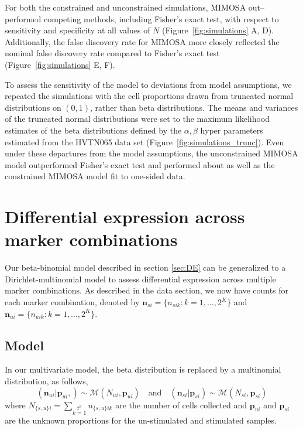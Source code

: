 \documentclass[11pt]{article}
\begin{document}
For both the constrained and unconstrained simulations, MIMOSA out--performed competing methods, including Fisher's exact test, with respect to sensitivity and specificity at all values of $N$ (Figure~\ref{fig:simulations} A, D). Additionally, the false discovery rate for MIMOSA more closely reflected the nominal false discovery rate compared to Fisher's exact test (Figure~\ref{fig:simulations} E, F).

To assess the sensitivity of the model to deviations from model assumptions, we repeated the simulations with the cell proportions drawn from  truncated normal distributions on $(0,1)$, rather than beta distributions. The means and variances of the truncated normal distributions were set to the maximum likelihood estimates of the beta distributions defined by the $\alpha,\beta$ hyper parameters estimated from the HVTN065 data set (Figure~\ref{fig:simulations_trunc}). Even under these departures from the model assumptions, the unconstrained MIMOSA model outperformed Fisher's exact test and performed about as well as the constrained MIMOSA model fit to one-sided data.

\section{Differential expression across marker combinations}
Our beta-binomial model described in section \ref{sec:DE} can be generalized to a Dirichlet-multinomial model to assess differential expression across multiple marker combinations. As described in the data section, we now have counts for each marker combination, denoted by  $\mathbf{n}_{si}=\{n_{sik}: k=1,\dots,2^K\}$ and $\mathbf{n}_{ui}=\{n_{uik}: k=1,\dots,2^K\}$. 
\subsection{Model}

In our multivariate model, the beta distribution is replaced by a multinomial distribution, as follows,
\begin{equation}
 (\mathbf{n}_{ui}|\mathbf{p}_{ui},) \sim \mathcal{M}(N_{ui},\mathbf{p}_{ui})\quad\text{and}\quad (\mathbf{n}_{si}|\mathbf{p}_{si}) \sim \mathcal{M}(N_{si},\mathbf{p}_{si})\label{eq:mult_likeliehood}
 \end{equation}
where $N_{\{s,u\}i}=\sum\limits_{k=1}\limits^{2^K} n_{\{s,u\}ik}$ are the number of cells collected and $\mathbf{p}_{ui}$ and $\mathbf{p}_{si}$ are the unknown proportions for the un-stimulated and stimulated samples.
\end{document}
